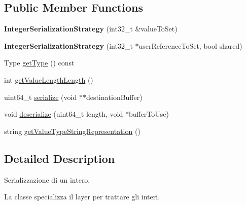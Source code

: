\subsection*{Public Member Functions}
\begin{DoxyCompactItemize}
\item 
\hypertarget{class_integer_serialization_strategy_ae141aa24aec4665ba0bad91d46d19ff7}{
{\bfseries IntegerSerializationStrategy} (int32\_\-t \&valueToSet)}
\label{class_integer_serialization_strategy_ae141aa24aec4665ba0bad91d46d19ff7}

\item 
\hypertarget{class_integer_serialization_strategy_a66091ffab5c0b2eaa94429307304d91b}{
{\bfseries IntegerSerializationStrategy} (int32\_\-t $\ast$userReferenceToSet, bool shared)}
\label{class_integer_serialization_strategy_a66091ffab5c0b2eaa94429307304d91b}

\item 
Type \hyperlink{class_integer_serialization_strategy_a06e6e5d78022e90f15576fdded78c3b9}{getType} () const 
\item 
int \hyperlink{class_integer_serialization_strategy_a8f1e79770a9c3a9591d380a3dcc27961}{getValueLengthLength} ()
\item 
uint64\_\-t \hyperlink{class_integer_serialization_strategy_aab13f80cdcc784a03ae4c78f421f4ad1}{serialize} (void $\ast$$\ast$destinationBuffer)
\item 
void \hyperlink{class_integer_serialization_strategy_ac097be13dc735f0b5a1b5e264ec22cd2}{deserialize} (uint64\_\-t length, void $\ast$bufferToUse)
\item 
string \hyperlink{class_integer_serialization_strategy_a6a0c31140732e39c69928f8a75a87735}{getValueTypeStringRepresentation} ()
\end{DoxyCompactItemize}


\subsection{Detailed Description}
Serializzazione di un intero. 

La classe specializza il layer per trattare gli interi. 

